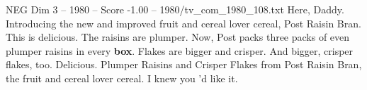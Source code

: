 \begin{textsample}{NEG Dim 3 – 1980 – Score -1.00 – 1980/tv\_com\_1980\_108.txt}  \label{ex:f3_neg_043}
Here, Daddy.
Introducing the new and improved fruit and cereal lover cereal, Post Raisin Bran.
This is delicious.
The raisins are plumper.
Now, Post packs three packs of even plumper raisins in every \textbf{box}.
Flakes are bigger and crisper.
And bigger, crisper flakes, too.
Delicious.
Plumper Raisins and Crisper Flakes from Post Raisin Bran, the fruit and cereal lover cereal.
I knew you 'd like it.

\end{textsample}
